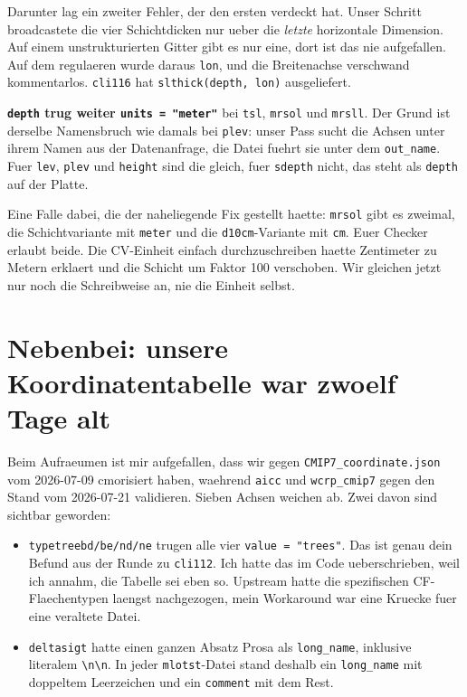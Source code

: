 \documentclass[11pt,a4paper]{article}
\newcommand{\code}[1]{\texttt{\small #1}}
\begin{document}
Darunter lag ein zweiter Fehler, der den ersten verdeckt hat. Unser Schritt
broadcastete die vier Schichtdicken nur ueber die \emph{letzte} horizontale
Dimension. Auf einem unstrukturierten Gitter gibt es nur eine, dort ist das nie
aufgefallen. Auf dem regulaeren wurde daraus \code{lon}, und die Breitenachse
verschwand kommentarlos. \code{cli116} hat \code{slthick(depth, lon)} ausgeliefert.

\textbf{\code{depth} trug weiter \code{units = "meter"}} bei \code{tsl},
\code{mrsol} und \code{mrsll}. Der Grund ist derselbe Namensbruch wie damals bei
\code{plev}: unser Pass sucht die Achsen unter ihrem Namen aus der Datenanfrage, die
Datei fuehrt sie unter dem \code{out\_name}. Fuer \code{lev}, \code{plev} und
\code{height} sind die gleich, fuer \code{sdepth} nicht, das steht als \code{depth}
auf der Platte.

Eine Falle dabei, die der naheliegende Fix gestellt haette: \code{mrsol} gibt es
zweimal, die Schichtvariante mit \code{meter} und die \code{d10cm}-Variante mit
\code{cm}. Euer Checker erlaubt beide. Die CV-Einheit einfach durchzuschreiben
haette Zentimeter zu Metern erklaert und die Schicht um Faktor 100 verschoben. Wir
gleichen jetzt nur noch die Schreibweise an, nie die Einheit selbst.

\section{Nebenbei: unsere Koordinatentabelle war zwoelf Tage alt}

Beim Aufraeumen ist mir aufgefallen, dass wir gegen \code{CMIP7\_coordinate.json}
vom 2026-07-09 cmorisiert haben, waehrend \code{aicc} und \code{wcrp\_cmip7} gegen
den Stand vom 2026-07-21 validieren. Sieben Achsen weichen ab. Zwei davon sind
sichtbar geworden:

\begin{itemize}
\item \code{typetreebd/be/nd/ne} trugen alle vier \code{value = "trees"}. Das ist
  genau dein Befund aus der Runde zu \code{cli112}. Ich hatte das im Code
  ueberschrieben, weil ich annahm, die Tabelle sei eben so. Upstream hatte die
  spezifischen CF-Flaechentypen laengst nachgezogen, mein Workaround war eine
  Kruecke fuer eine veraltete Datei.
\item \code{deltasigt} hatte einen ganzen Absatz Prosa als \code{long\_name},
  inklusive literalem \verb|\n\n|. In jeder \code{mlotst}-Datei stand deshalb ein
  \code{long\_name} mit doppeltem Leerzeichen und ein \code{comment} mit dem Rest.
\end{itemize}
\end{document}
